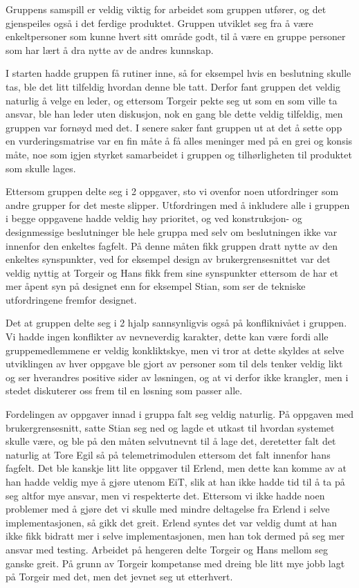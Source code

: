 Gruppens samspill er veldig viktig for arbeidet som gruppen utfører, og det gjenspeiles også i det ferdige produktet.
Gruppen utviklet seg fra å være enkeltpersoner som kunne hvert sitt område godt, til å være en gruppe personer som har lært å dra nytte av de andres kunnskap.

I starten hadde gruppen få rutiner inne, så for eksempel hvis en beslutning skulle tas, ble det litt tilfeldig hvordan denne ble tatt. Derfor fant gruppen det veldig naturlig å velge en leder, og ettersom Torgeir pekte seg ut som en som ville ta ansvar, ble han leder uten diskusjon, nok en gang ble dette veldig tilfeldig, men gruppen var fornøyd med det. I senere saker fant gruppen ut at det å sette opp en vurderingsmatrise var en fin måte å få alles meninger med på en grei og konsis måte, noe som igjen styrket samarbeidet i gruppen og tilhørligheten til produktet som skulle lages.

Ettersom gruppen delte seg i 2 oppgaver, sto vi ovenfor noen utfordringer som andre grupper for det meste slipper. Utfordringen med å inkludere alle i gruppen i begge oppgavene hadde veldig høy prioritet, og ved konstruksjon- og designmessige beslutninger ble hele gruppa med selv om beslutningen ikke var innenfor den enkeltes fagfelt. På denne måten fikk gruppen dratt nytte av den enkeltes synspunkter, ved for eksempel design av brukergrensesnittet var det veldig nyttig at Torgeir og Hans fikk frem sine synspunkter ettersom de har et mer åpent syn på designet enn for eksempel Stian, som ser de tekniske utfordringene fremfor designet.

Det at gruppen delte seg i 2 hjalp sannsynligvis også på konfliknivået i gruppen. Vi hadde ingen konflikter av nevneverdig karakter, dette kan være fordi alle gruppemedlemmene er veldig konkliktskye, men vi tror at dette skyldes at selve utviklingen av hver oppgave ble gjort av personer som til dels tenker veldig likt og ser hverandres positive sider av løsningen, og at vi derfor ikke krangler, men i stedet diskuterer oss frem til en løsning som passer alle.

Fordelingen av oppgaver innad i gruppa falt seg veldig naturlig. På oppgaven med brukergrensesnitt, satte Stian seg ned og lagde et utkast til hvordan systemet skulle være, og ble på den måten selvutnevnt til å lage det, deretetter falt det naturlig at Tore Egil så på telemetrimodulen ettersom det falt innenfor hans fagfelt. Det ble kanskje litt lite oppgaver til Erlend, men dette kan komme av at han hadde veldig mye å gjøre utenom EiT, slik at han ikke hadde tid til å ta på seg altfor mye ansvar, men vi respekterte det. Ettersom vi ikke hadde noen problemer med å gjøre det vi skulle med mindre deltagelse fra Erlend i selve implementasjonen, så gikk det greit. Erlend syntes det var veldig dumt at han ikke fikk bidratt mer i selve implementasjonen, men han tok dermed på seg mer ansvar med testing. Arbeidet på hengeren delte Torgeir og Hans mellom seg ganske greit. På grunn av Torgeir kompetanse med dreing ble litt mye jobb lagt på Torgeir med det, men det jevnet seg ut etterhvert.


